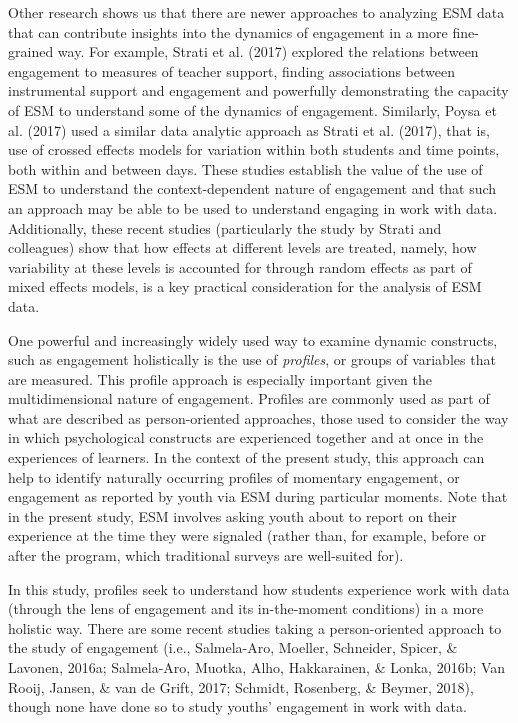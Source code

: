 \documentclass[]{msu-thesis}
\theoremstyle{definition}
\theoremstyle{definition}
\theoremstyle{definition}
\theoremstyle{remark}
\begin{document}
Other research shows us that there are newer approaches to analyzing ESM
data that can contribute insights into the dynamics of engagement in a
more fine-grained way. For example, Strati et al. (2017) explored the
relations between engagement to measures of teacher support, finding
associations between instrumental support and engagement and powerfully
demonstrating the capacity of ESM to understand some of the dynamics of
engagement. Similarly, Poysa et al. (2017) used a similar data analytic
approach as Strati et al. (2017), that is, use of crossed effects models
for variation within both students and time points, both within and
between days. These studies establish the value of the use of ESM to
understand the context-dependent nature of engagement and that such an
approach may be able to be used to understand engaging in work with
data. Additionally, these recent studies (particularly the study by
Strati and colleagues) show that how effects at different levels are
treated, namely, how variability at these levels is accounted for
through random effects as part of mixed effects models, is a key
practical consideration for the analysis of ESM data.

One powerful and increasingly widely used way to examine dynamic
constructs, such as engagement holistically is the use of
\emph{profiles}, or groups of variables that are measured. This profile
approach is especially important given the multidimensional nature of
engagement. Profiles are commonly used as part of what are described as
person-oriented approaches, those used to consider the way in which
psychological constructs are experienced together and at once in the
experiences of learners. In the context of the present study, this
approach can help to identify naturally occurring profiles of momentary
engagement, or engagement as reported by youth via ESM during particular
moments. Note that in the present study, ESM involves asking youth about
to report on their experience at the time they were signaled (rather
than, for example, before or after the program, which traditional
surveys are well-suited for).

In this study, profiles seek to understand how students experience work
with data (through the lens of engagement and its in-the-moment
conditions) in a more holistic way. There are some recent studies taking
a person-oriented approach to the study of engagement (i.e.,
Salmela-Aro, Moeller, Schneider, Spicer, \& Lavonen, 2016a; Salmela-Aro,
Muotka, Alho, Hakkarainen, \& Lonka, 2016b; Van Rooij, Jansen, \& van de
Grift, 2017; Schmidt, Rosenberg, \& Beymer, 2018), though none have done
so to study youths' engagement in work with data.
\end{document}
